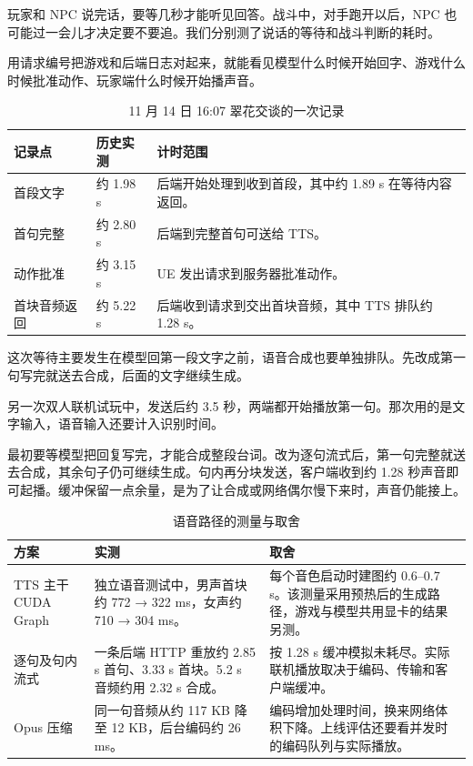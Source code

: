 \documentclass[11pt]{article}
\begin{document}

玩家和 NPC 说完话，要等几秒才能听见回答。战斗中，对手跑开以后，NPC 也可能过一会儿才决定要不要追。我们分别测了说话的等待和战斗判断的耗时。


用请求编号把游戏和后端日志对起来，就能看见模型什么时候开始回字、游戏什么时候批准动作、玩家端什么时候开始播声音。

\begin{table}[H]\small
\begin{tabularx}{\textwidth}{@{}l l L@{}}
\toprule 记录点 & 历史实测 & 计时范围 \\
\midrule
首段文字 & 约 1.98 s & 后端开始处理到收到首段，其中约 1.89 s 在等待内容返回。\\
首句完整 & 约 2.80 s & 后端到完整首句可送给 TTS。\\
动作批准 & 约 3.15 s & UE 发出请求到服务器批准动作。\\
首块音频返回 & 约 5.22 s & 后端收到请求到交出首块音频，其中 TTS 排队约 1.28 s。\\
\bottomrule
\end{tabularx}
\caption{11 月 14 日 16:07 翠花交谈的一次记录}
\end{table}

这次等待主要发生在模型回第一段文字之前，语音合成也要单独排队。先改成第一句写完就送去合成，后面的文字继续生成。

另一次双人联机试玩中，发送后约 3.5 秒，两端都开始播放第一句。那次用的是文字输入，语音输入还要计入识别时间。



\clearpage
{}

最初要等模型把回复写完，才能合成整段台词。改为逐句流式后，第一句完整就送去合成，其余句子仍可继续生成。句内再分块发送，客户端收到约 1.28 秒声音即可起播。缓冲保留一点余量，是为了让合成或网络偶尔慢下来时，声音仍能接上。

\begin{table}[H]\small
\begin{tabularx}{\textwidth}{@{}l L L@{}}
\toprule 方案 & 实测 & 取舍 \\
\midrule
TTS 主干 CUDA Graph & 独立语音测试中，男声首块约 772 → 322 ms，女声约 710 → 304 ms。 & 每个音色启动时建图约 0.6--0.7 s。该测量采用预热后的生成路径，游戏与模型共用显卡的结果另测。\\
逐句及句内流式 & 一条后端 HTTP 重放约 2.85 s 首句、3.33 s 首块。5.2 s 音频约用 2.32 s 合成。 & 按 1.28 s 缓冲模拟未耗尽。实际联机播放取决于编码、传输和客户端缓冲。\\
Opus 压缩 & 同一句音频从约 117 KB 降至 12 KB，后台编码约 26 ms。 & 编码增加处理时间，换来网络体积下降。上线评估还要看并发时的编码队列与实际播放。\\
\bottomrule
\end{tabularx}
\caption{语音路径的测量与取舍}
\end{table}
\end{document}

